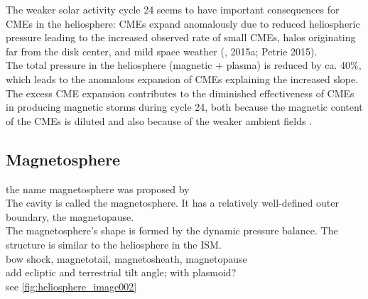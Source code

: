 The weaker solar activity cycle 24 seems to have important consequences for CMEs in the heliosphere: CMEs expand anomalously due to reduced heliospheric pressure leading to the increased observed rate of small CMEs, halos originating far from the disk center, and mild space weather (\citep{Gopalswamy2014}, 2015a; Petrie 2015).\\
The total pressure in the heliosphere (magnetic + plasma) is reduced by ca. 40\%, which leads to the anomalous expansion of CMEs explaining the increased slope. The excess CME expansion contributes to the diminished effectiveness of CMEs in producing magnetic storms during cycle 24, both because the magnetic content of the CMEs is diluted and also because of the weaker ambient fields \citep{Gopalswamy2014}.\\


\subsection{Magnetosphere}
\label{sec:magnetosphere}

the name magnetosphere was proposed by \citet{Gold1959}\\

The cavity is called the magnetosphere. It has a relatively well-defined outer boundary, the magnetopause.\\

The magnetosphere's shape is formed by the dynamic pressure balance. The structure is similar to the heliosphere in the ISM.\\

bow shock, magnetotail, magnetosheath, magnetopause\\
add ecliptic and terrestrial tilt angle; with plasmoid?\\
see \autoref{fig:heliosphere_image002}\\
\begin{figure}[htb]
\end{figure}

